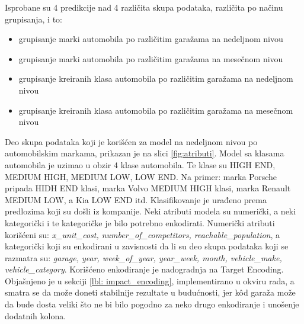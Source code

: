 \documentclass[12pt,oneside]{memoir}
\begin{document}
Isprobane su 4 predikcije nad 4 različita skupa podataka, različita po načinu grupisanja, i to:
\begin{itemize}
    \item  grupisanje marki automobila po različitim garažama na nedeljnom nivou
    \item grupisanje marki automobila po različitim garažama na mesečnom nivou
    \item grupisanje kreiranih klasa automobila po različitim garažama na nedeljnom nivou
    \item grupisanje kreiranih klasa automobila po različitim garažama na mesečnom nivou
\end{itemize}
Deo skupa podataka koji je korišćen za model na nedeljnom nivou po automobilskim markama, prikazan je na slici \ref{fig:atributi}. Model sa klasama automobila je uzimao u obzir 4 klase automobila. Te klase su HIGH END, MEDIUM HIGH, MEDIUM LOW, LOW END. Na primer: marka Porsche pripada HIDH END klasi, marka Volvo MEDIUM HIGH klasi, marka Renault MEDIUM LOW, a Kia LOW END itd. Klasifikovanje je urađeno prema predlozima koji su došli iz kompanije. Neki atributi modela su numerički, a neki kategorički i te kategoričke je bilo potrebno enkodirati. Numerički atributi korišćeni su: \textit{x\_unit\_cost, number\_of\_competitors, reachable\_population}, a kategorički koji su enkodirani u zavisnosti da li su deo skupa podataka koji se razmatra su: \textit{garage, year, week\_of\_year, year\_week, month, vehicle\_make, vehicle\_category}. Korišćeno enkodiranje je nadogradnja na Target Encoding. Objašnjeno je u sekciji \ref{lbl: impact_encoding}, implementirano u okviru rada, a smatra se da može doneti stabilnije rezultate u budućnosti, jer kôd garaža može da bude dosta veliki što ne bi bilo pogodno za neko drugo enkodiranje i unošenje dodatnih kolona.
\end{document}

